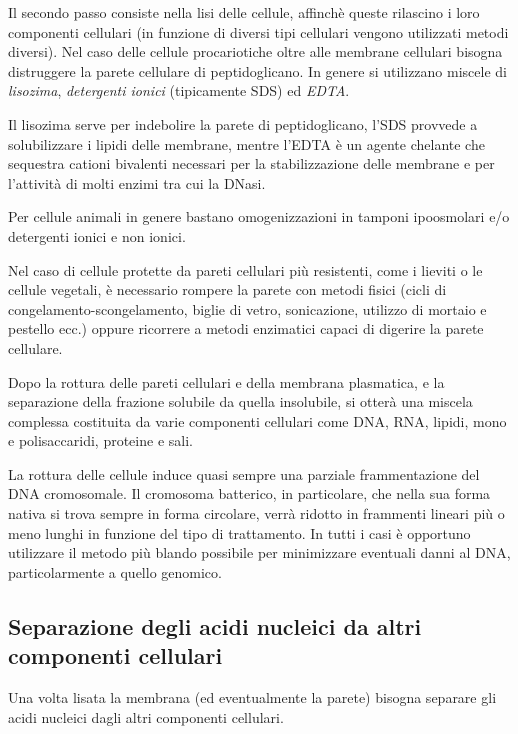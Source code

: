\documentclass[]{article}
\begin{document}
Il secondo passo consiste nella lisi delle cellule, affinchè queste
rilascino i loro componenti cellulari (in funzione di diversi tipi
cellulari vengono utilizzati metodi diversi). Nel caso delle cellule
procariotiche oltre alle membrane cellulari bisogna distruggere la
parete cellulare di peptidoglicano. In genere si utilizzano miscele di
\emph{lisozima}, \emph{detergenti ionici} (tipicamente SDS) ed
\emph{EDTA}.

Il lisozima serve per indebolire la parete di peptidoglicano, l'SDS
provvede a solubilizzare i lipidi delle membrane, mentre l'EDTA è un
agente chelante che sequestra cationi bivalenti necessari per la
stabilizzazione delle membrane e per l'attività di molti enzimi tra cui
la DNasi.

Per cellule animali in genere bastano omogenizzazioni in tamponi
ipoosmolari e/o detergenti ionici e non ionici.

Nel caso di cellule protette da pareti cellulari più resistenti, come i
lieviti o le cellule vegetali, è necessario rompere la parete con metodi
fisici (cicli di congelamento-scongelamento, biglie di vetro,
sonicazione, utilizzo di mortaio e pestello ecc.) oppure ricorrere a
metodi enzimatici capaci di digerire la parete cellulare.

Dopo la rottura delle pareti cellulari e della membrana plasmatica, e la
separazione della frazione solubile da quella insolubile, si otterà una
miscela complessa costituita da varie componenti cellulari come DNA,
RNA, lipidi, mono e polisaccaridi, proteine e sali.

La rottura delle cellule induce quasi sempre una parziale frammentazione
del DNA cromosomale. Il cromosoma batterico, in particolare, che nella
sua forma nativa si trova sempre in forma circolare, verrà ridotto in
frammenti lineari più o meno lunghi in funzione del tipo di trattamento.
In tutti i casi è opportuno utilizzare il metodo più blando possibile
per minimizzare eventuali danni al DNA, particolarmente a quello
genomico.

\subsection{Separazione degli acidi nucleici da altri componenti
cellulari}\label{separazione-degli-acidi-nucleici-da-altri-componenti-cellulari}

Una volta lisata la membrana (ed eventualmente la parete) bisogna
separare gli acidi nucleici dagli altri componenti cellulari.
\end{document}
